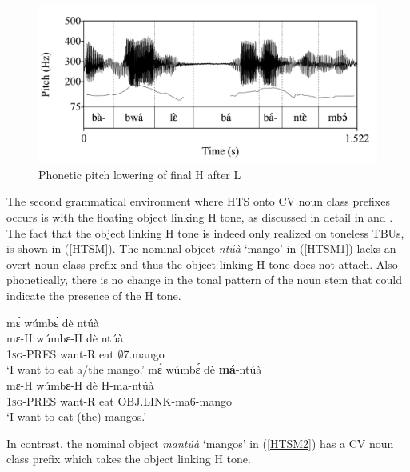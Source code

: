 \begin{figure} 
\centering
\includegraphics[width=\textwidth]{figures/Final-lowering.jpg}
\caption{Phonetic pitch lowering of final H after L}
\label{Fig:FinalLow}
\end{figure}






The second grammatical environment where HTS onto CV noun class prefixes occurs is with the floating object linking H tone, as discussed in detail in  and . The fact that the object linking H tone is indeed only realized on toneless TBUs, is shown in (\ref{HTSM}). The nominal object {\itshape ntúà} `mango' in (\ref{HTSM1}) lacks an overt noun class prefix and thus the object linking H tone does not attach. Also phonetically, there is no change in the tonal pattern of the noun stem that could indicate the presence of the H tone. 

\begin{exe} 
\ex\label{HTSM}
\begin{xlist}
\ex\label{HTSM1}
  \glll    mɛ́ wúmbɛ́ dè ntúà  \\
	    mɛ-H wúmbɛ-H dè ntúà \\ 
              1\textsc{sg}-PRES want-R eat $\emptyset$7.mango   \\
    \trans `I want to eat a/the mango.'
\ex\label{HTSM2}
  \glll    mɛ́ wúmbɛ́ dè {\bfseries má}-ntúà  \\
	    mɛ-H wúmbɛ-H dè H-ma-ntúà \\ 
              1\textsc{sg}-PRES want-R eat OBJ.LINK-ma6-mango   \\
    \trans `I want to eat (the) mangos.'
\end{xlist}
\end{exe}

\noindent  In contrast, the nominal object {\itshape mantúà} `mangos' in (\ref{HTSM2}) has a CV noun class prefix which takes the object linking H tone.

